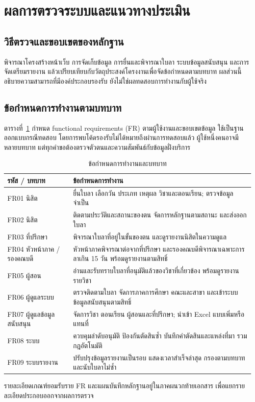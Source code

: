 \section{ผลการตรวจระบบและแนวทางประเมิน}
\subsection{วิธีตรวจและขอบเขตของหลักฐาน}
พิจารณาโครงสร้างหน้าเว็บ การจัดเก็บข้อมูล การยื่นและพิจารณาใบลา ระบบข้อมูลสนับสนุน และการจัดเตรียมรายงาน แล้วเปรียบเทียบกับวัตถุประสงค์โครงงานเพื่อจัดข้อกำหนดตามบทบาท ผลส่วนนี้อธิบายความสามารถที่มีองค์ประกอบรองรับ ยังไม่ใช่ผลทดสอบการทำงานกับผู้ใช้จริง
\subsection{ข้อกำหนดการทำงานตามบทบาท}
ตารางที่~\ref{tab:functional-role} กำหนด functional requirements (FR) ตามผู้ใช้งานและขอบเขตข้อมูล ใช้เป็นฐานออกแบบกรณีทดสอบ โดยการพบโค้ดรองรับไม่ได้หมายถึงผ่านการทดสอบแล้ว ผู้ใช้หนึ่งคนอาจมีหลายบทบาท แต่ทุกคำขอต้องตรวจตัวตนและความสัมพันธ์กับข้อมูลฝั่งบริการ
\begin{table}[H]
\caption{ข้อกำหนดการทำงานและบทบาท}\label{tab:functional-role}
\centering
\begin{tabularx}{\columnwidth}{|p{23mm}|X|}
\hline
รหัส / บทบาท & ข้อกำหนดการทำงาน \\ \hline
FR01 นิสิต & ยื่นใบลา เลือกวัน ประเภท เหตุผล วิชาและตอนเรียน; ตรวจข้อมูลจำเป็น \\ \hline
FR02 นิสิต & ติดตามประวัติและสถานะของตน จัดการหลักฐานตามสถานะ และส่งออกใบลา \\ \hline
FR03 ที่ปรึกษา & พิจารณาใบลาที่อยู่ในขั้นของตน และดูรายงานนิสิตในความดูแล \\ \hline
FR04 หัวหน้าภาค / รองคณบดี & หัวหน้าภาคพิจารณาต่อจากที่ปรึกษา และรองคณบดีพิจารณาเฉพาะการลาเกิน 15 วัน พร้อมดูรายงานตามสิทธิ์ \\ \hline
FR05 ผู้สอน & อ่านและรับทราบใบลาที่อนุมัติแล้วของวิชาที่เกี่ยวข้อง พร้อมดูรายงานรายวิชา \\ \hline
FR06 ผู้ดูแลระบบ & ตรวจติดตามใบลา จัดการภาคการศึกษา คณะและสาขา และเข้าระบบข้อมูลสนับสนุนตามสิทธิ์ \\ \hline
FR07 ผู้ดูแลข้อมูลสนับสนุน & จัดการวิชา ตอนเรียน ผู้สอนและที่ปรึกษา; นำเข้า Excel แบบเพิ่มหรือแทนที่ \\ \hline
FR08 ระบบ & ควบคุมลำดับอนุมัติ ป้องกันตัดสินซ้ำ บันทึกคำตัดสินและแหล่งที่มา รวมกฎอัตโนมัติ \\ \hline
FR09 ระบบรายงาน & ปรับปรุงข้อมูลรายงานเป็นรอบ แสดงเวลาสำเร็จล่าสุด กรองตามบทบาท และนับใบลาไม่ซ้ำ \\ \hline
\end{tabularx}
\end{table}
รายละเอียดเกณฑ์ยอมรับราย FR และแผนบันทึกหลักฐานอยู่ในภาคผนวกท้ายเอกสาร เพื่อแยกรายละเอียดประกอบออกจากผลการตรวจ

